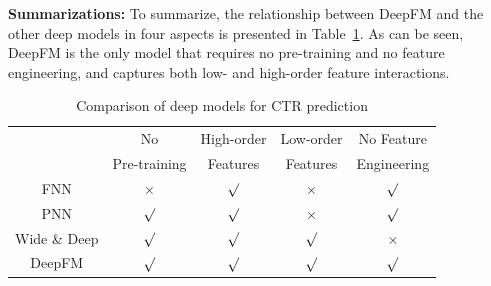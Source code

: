 \noindent\textbf{Summarizations:} To summarize, the relationship between DeepFM and the other deep models in four aspects is presented in Table~\ref{table:Modelcompare}. As can be seen, DeepFM is the only model that requires no pre-training and no feature engineering, and captures both low- and high-order feature interactions.

\begin{table}
\centering
\scriptsize
\caption{\footnotesize{Comparison of deep models for CTR prediction}}\label{table:Modelcompare}
\begin{tabular}{|c|c|c|c|c|}
\hline
 &  No& High-order  & Low-order  & No Feature \\
 &Pre-training     & Features     & Features    & Engineering \\ \hline
FNN & $\times$ & $\surd$  & $\times$ & $\surd$ \\ \hline
PNN & ${\surd}$ & ${\surd}$  & ${\times}$ & ${\surd}$ \\ \hline
Wide \& Deep & ${\surd}$   & ${\surd}$  & ${\surd}$  & ${\times}$\\ \hline
DeepFM & ${\surd}$ & ${\surd}$  & ${\surd}$  & ${\surd}$ \\ \hline
\end{tabular}
\end{table}
